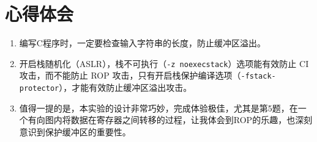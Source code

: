 \documentclass[12pt,a4paper]{article}
\begin{document}
\section{心得体会}

\begin{enumerate}[1.]
    \item 编写C程序时，一定要检查输入字符串的长度，防止缓冲区溢出。
    \item 开启栈随机化（ASLR），栈不可执行（\verb|-z noexecstack|）选项能有效防止 CI 攻击，而不能防止 ROP 攻击，只有开启栈保护编译选项（\verb|-fstack-protector|），才能有效防止缓冲区溢出攻击。
    \item 值得一提的是，本实验的设计非常巧妙，完成体验极佳，尤其是第5题，在一个有向图内将数据在寄存器之间转移的过程，让我体会到ROP的乐趣，也深刻意识到保护缓冲区的重要性。
\end{enumerate}
\end{document}
